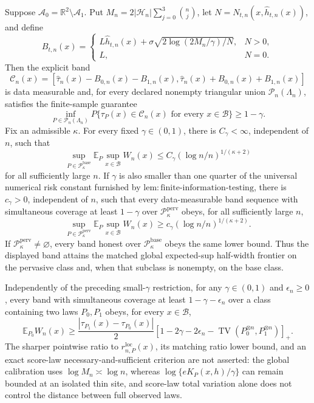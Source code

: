 Suppose \(\mathcal A_0=\mathbb R^2\setminus\mathcal A_1\). Put \(M_n=2|\mathcal H_n|\sum_{j=0}^3\binom nj\), let \(N=N_{t,n}(x,\widehat h_{t,n}(x))\), and define
\[
 B_{t,n}(x)=
 \begin{cases}
 L\widehat h_{t,n}(x)+\sigma\sqrt{2\log(2M_n/\gamma)/N},&N>0,\\
 L,&N=0.
 \end{cases}
\]
Then the explicit band
\[
 \mathcal C_n(x)=
 \left[\widehat\tau_n(x)-B_{0,n}(x)-B_{1,n}(x),
 \widehat\tau_n(x)+B_{0,n}(x)+B_{1,n}(x)\right]
\]
is data measurable and, for every declared nonempty triangular union \(\mathcal P_n(\Lambda_n)\), satisfies the finite-sample guarantee
\[
 \inf_{P\in\mathcal P_n(\Lambda_n)}P\{\tau_P(x)\in\mathcal C_n(x)\text{ for every }x\in\mathcal B\}\ge1-\gamma.
\]
Fix an admissible \(\kappa\).  For every fixed \(\gamma\in(0,1)\), there is \(C_\gamma<\infty\), independent of \(n\), such that
\[
 \sup_{P\in\mathcal P_{\kappa}^{\mathrm{base}}}
 \mathbb E_P\sup_{x\in\mathcal B}W_n(x)
 \le C_\gamma(\log n/n)^{1/(\kappa+2)}
\]
for all sufficiently large \(n\).  If \(\gamma\) is also smaller than one quarter of the universal numerical risk constant furnished by \(\mathrm{lem:finite\text{-}information\text{-}testing}\), there is \(c_\gamma>0\), independent of \(n\), such that every data-measurable band sequence with simultaneous coverage at least \(1-\gamma\) over \(\mathcal P_{\kappa}^{\mathrm{perv}}\) obeys, for all sufficiently large \(n\),
\[
 \sup_{P\in\mathcal P_{\kappa}^{\mathrm{perv}}}
 \mathbb E_P\sup_{x\in\mathcal B}W_n(x)
 \ge c_\gamma(\log n/n)^{1/(\kappa+2)}.
\]
If \(\mathcal P_{\kappa}^{\mathrm{perv}}\ne\varnothing\), every band honest over \(\mathcal P_{\kappa}^{\mathrm{base}}\) obeys the same lower bound.  Thus the displayed band attains the matched global expected-sup half-width frontier on the pervasive class and, when that subclass is nonempty, on the base class.

Independently of the preceding small-\(\gamma\) restriction, for any \(\gamma\in(0,1)\) and \(\epsilon_n\ge0\), every band with simultaneous coverage at least \(1-\gamma-\epsilon_n\) over a class containing two laws \(P_0,P_1\) obeys, for every \(x\in\mathcal B\),
\[
 \mathbb E_{P_0}W_n(x)\ge\frac{|\tau_{P_1}(x)-\tau_{P_0}(x)|}{2}
 \left[1-2\gamma-2\epsilon_n-
 \operatorname{TV}(P_0^{\otimes n},P_1^{\otimes n})\right]_+.
\]
The sharper pointwise ratio to \(r_{n,P}^{\mathrm{loc}}(x)\), its matching ratio lower bound, and an exact score-law necessary-and-sufficient criterion are not asserted: the global calibration uses \(\log M_n\asymp\log n\), whereas \(\log\{eK_P(x,h)/\gamma\}\) can remain bounded at an isolated thin site, and score-law total variation alone does not control the distance between full observed laws.